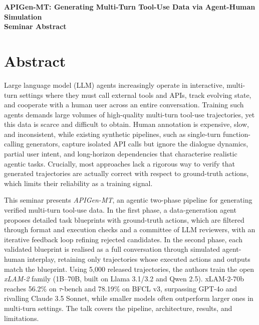 \documentclass[11pt]{article}
\begin{document}
\begin{center}
{\LARGE\bfseries APIGen-MT: Generating Multi-Turn Tool-Use Data via Agent-Human Simulation}\\[1.1em]
{\large\bfseries Seminar Abstract}\\[0.6em]
{\normalsize \seminarDate}
\end{center}
\vspace{0.6em}
\section*{Abstract}
Large language model (LLM) agents increasingly operate in interactive, multi-turn settings where they must call external tools and APIs, track evolving state, and cooperate with a human user across an entire conversation. Training such agents demands large volumes of high-quality multi-turn tool-use trajectories, yet this data is scarce and difficult to obtain. Human annotation is expensive, slow, and inconsistent, while existing synthetic pipelines, such as single-turn function-calling generators, capture isolated API calls but ignore the dialogue dynamics, partial user intent, and long-horizon dependencies that characterise realistic agentic tasks. Crucially, most approaches lack a rigorous way to verify that generated trajectories are actually correct with respect to ground-truth actions, which limits their reliability as a training signal.

This seminar presents \emph{APIGen-MT}, an agentic two-phase pipeline for generating verified multi-turn tool-use data. In the first phase, a data-generation agent proposes detailed task blueprints with ground-truth actions, which are filtered through format and execution checks and a committee of LLM reviewers, with an iterative feedback loop refining rejected candidates. In the second phase, each validated blueprint is realised as a full conversation through simulated agent-human interplay, retaining only trajectories whose executed actions and outputs match the blueprint. Using 5,000 released trajectories, the authors train the open \emph{xLAM-2} family (1B--70B, built on Llama 3.1/3.2 and Qwen 2.5). xLAM-2-70b reaches 56.2\% on $\tau$-bench and 78.19\% on BFCL v3, surpassing GPT-4o and rivalling Claude 3.5 Sonnet, while smaller models often outperform larger ones in multi-turn settings. The talk covers the pipeline, architecture, results, and limitations.
\end{document}
